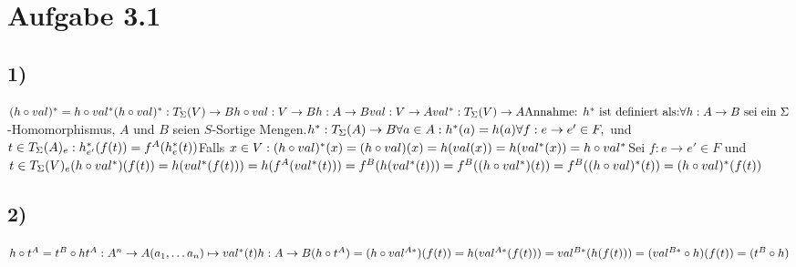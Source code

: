 \section*{Aufgabe 3.1}
\subsection*{1)}
$(h \circ val)^* = h \circ val^*\\
\\
(h \circ val)^* : T_{\Sigma}(V) \rightarrow B\\
h \circ val : V \rightarrow B\\
h : A \rightarrow B\\
val : V \rightarrow A\\
val^* : T_\Sigma(V) \rightarrow A\\
\\
\text{Annahme: } h^* \text{ ist definiert als:}\\
\forall h : A \rightarrow B \text{ sei ein } \Sigma$-Homomorphismus, $A$ und $B$ seien $S$-Sortige Mengen.$\\
h^* : T_\Sigma(A) \rightarrow B\\
\forall a\in A: h^*(a) = h(a)\\
\forall f: e \rightarrow e' \in F, $ und $ t \in T_\Sigma(A)_e: h_{e'}^*(f(t)) = f^A(h_e^*(t))\\
\\
$Falls $ x\in V:\\
(h\circ val)^*(x) = (h\circ val)(x) = h(val(x)) = h(val^*(x)) = h\circ val^* \\
$Sei $f:e\rightarrow e' \in F$ und $t\in T_\Sigma(V)_e\\
(h\circ val^*)(f(t))=h(val^*(f(t)))=h(f^A(val^*(t)))=f^B(h(val^*(t)))=f^B((h\circ val^*)(t)) = f^B((h\circ val)^*(t)) =(h\circ val)^*(f(t))$
\subsection*{2)}
$h\circ t^A = t^B \circ h\\
t^A:A^n\rightarrow A\\
(a_1,\dots a_n) \mapsto val^*(t)\\
h:A\rightarrow B\\
(h\circ t^A) = (h\circ val^{A*})(f(t)) = h(val^{A*}(f(t))) = val^{B*}(h(f(t))) = (val^{B*} \circ h)(f(t))=(t^B\circ h)$
